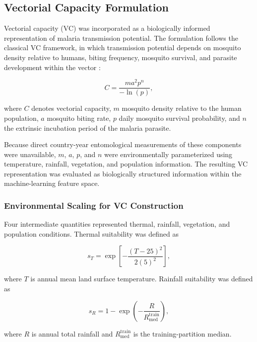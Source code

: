 \documentclass[10pt,twocolumn]{article}
\begin{document}
\subsection{Vectorial Capacity Formulation}

Vectorial capacity (VC) was incorporated as a biologically informed
representation of malaria transmission potential. The formulation
follows the classical VC framework, in which transmission potential
depends on mosquito density relative to humans, biting frequency,
mosquito survival, and parasite development within the vector
\parencite{Ross1905,Ross1907,LindsayBirley1996}:

\begin{equation}
C =
\frac{m a^2 p^n}{-\ln(p)},
\label{eq:vc}
\end{equation}

where \(C\) denotes vectorial capacity, \(m\) mosquito density relative
to the human population, \(a\) mosquito biting rate, \(p\) daily
mosquito survival probability, and \(n\) the extrinsic incubation
period of the malaria parasite.

Because direct country-year entomological measurements of these
components were unavailable, \(m\), \(a\), \(p\), and \(n\) were
environmentally parameterized using temperature, rainfall, vegetation,
and population information. The resulting VC representation was
evaluated as biologically structured information within the
machine-learning feature space.


\subsubsection{Environmental Scaling for VC Construction}

Four intermediate quantities represented thermal, rainfall, vegetation,
and population conditions. Thermal suitability was defined as

\begin{equation}
s_T =
\exp\left[
-\frac{(T-25)^2}{2(5)^2}
\right],
\label{eq:thermal_suitability}
\end{equation}

where \(T\) is annual mean land surface temperature. Rainfall
suitability was defined as

\begin{equation}
s_R =
1-\exp\left(
-\frac{R}{R_{\mathrm{med}}^{\mathrm{train}}}
\right),
\label{eq:rain_suitability}
\end{equation}

where \(R\) is annual total rainfall and
\(R_{\mathrm{med}}^{\mathrm{train}}\) is the training-partition median.
\end{document}
